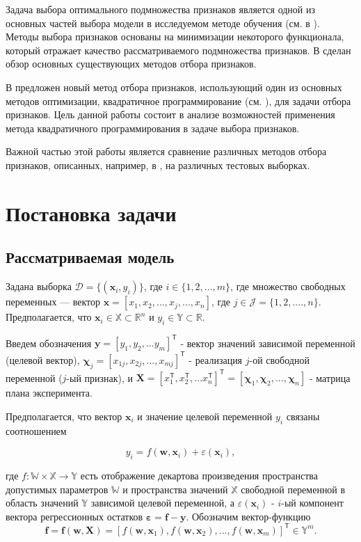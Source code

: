 \documentclass[12pt, twoside]{article}
\newcommand{\bx}{\mathbf{x}}
\newcommand{\by}{\mathbf{y}}
\newcommand{\bw}{\mathbf{w}}
\newcommand{\bfx}{\mathbf{f}}
\newcommand{\bX}{\mathbf{X}}
\newcommand{\bJ}{\mathcal{J}}
\newcommand{\bchi}{\mathbf{\chi}}
\newcommand{\beps}{\boldsymbol{\varepsilon}}
\newcommand{\getT}{^{\mathsf{T}}}
\begin{document}
Задача выбора оптимального подмножества признаков является одной из основных частей выбора модели в исследуемом методе обучения (см. в \cite{Bolon-Canedo}).
Методы выбора признаков основаны на минимизации некоторого функционала, который отражает качество
рассматриваемого подмножества признаков. В \cite{FeatureSelection1, FeatureSelection2} сделан обзор основных существующих методов отбора признаков.

В \cite{qpfs_original, KatrutsaS17} предложен новый метод отбора признаков, использующий один из основных методов оптимизации, квадратичное программирование (см. \cite{qpfs_original}), для задачи отбора признаков. Цель данной работы состоит в анализе возможностей применения метода квадратичного программирования в задаче выбора признаков. 

Важной частью этой работы является сравнение различных методов отбора признаков, описанных, например, в \cite{Katrutsa15}, на различных тестовых выборках.


\section{Постановка задачи}

\subsection{Рассматриваемая модель}
Задана выборка $\mathcal{D} = \{(\bx_i, y_i)\}$, где $i \in \{1, 2, ..., m\}$, где множество свободных переменных --- вектор $\bx = [x_1, x_2, ...,x_j, ..., x_n]$, где $j \in \bJ = \{1, 2, ...., n\}$. Предполагается, что $\bx_i \in \mathbb{X} \subset \mathbb{R}^n$ и $y_i \in \mathbb{Y} \subset \mathbb{R}$.

Введем обозначения $\by = [y_1, y_2, ... y_m]\getT$ - вектор значений зависимой переменной (целевой вектор), $\bchi_j = [x_{1j}, x_{2j}, ..., x_{mj}]\getT$ - реализация $j$-ой свободной переменной ($j$-ый признак), и $\bX = [x_1\getT, x_2\getT, ...x_n\getT]\getT = [\bchi_1, \bchi_2, ..., \bchi_n]$ - матрица плана эксперимента. 

Предполагается, что вектор $\bx_i$ и значение целевой переменной $y_i$ связаны соотношением 

$$y_i = f(\bw, \bx_i) + \varepsilon(\bx_i),$$

где $f: \mathbb{W} \times \mathbb{X} \rightarrow \mathbb{Y}$  есть отображение декартова произведения пространства допустимых параметров $\mathbb{W}$ и пространства значений $\mathbb{X}$ свободной переменной в область значений $\mathbb{Y}$ зависимой целевой переменной, а $\varepsilon(\bx_i)$ - $i$-ый компонент вектора регрессионных остатков $\beps = \bfx - \by.$ Обозначим вектор-функцию $$\bfx = \bfx(\bw, \bX) = [f(\bw, \bx_1), f(\bw, \bx_2), ..., f(\bw, \bx_m)]\getT \in \mathbb{Y}^m.$$
\end{document}
